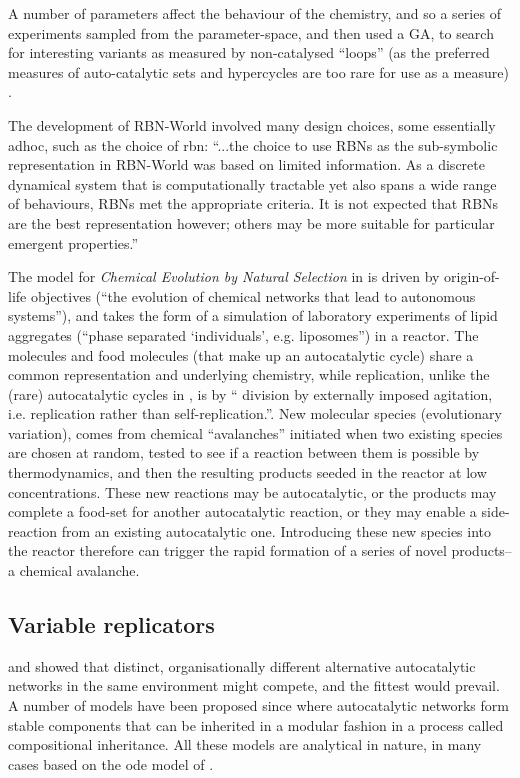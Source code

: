 A number of parameters affect the behaviour of the chemistry, and so a series of experiments sampled from the parameter-space, and then used a GA, to search for interesting variants as measured by non-catalysed ``loops'' (as the preferred measures of auto-catalytic sets and \glspl{hypercycle} are too rare for use as a measure) \parencite[chap.8]{Faulconbridge2011}. 

The development of RBN-World involved many design choices, some essentially adhoc, such as the choice of \gls{rbn}: ``...the choice to use RBNs as the sub-symbolic representation in RBN-World was based on limited information. As a discrete dynamical system that is computationally tractable yet also spans a wide range of behaviours, RBNs met the appropriate criteria. It is not expected that RBNs are the best representation however; others may be more suitable for particular emergent properties.''

The model for \emph{Chemical Evolution by Natural Selection} in \textcite{Fernando:2008xy,Fernando:2007pf} is driven by origin-of-life objectives (``the evolution of chemical networks that lead to autonomous systems''), and takes the form of a simulation of laboratory experiments of lipid aggregates (``phase separated ‘individuals’, e.g. liposomes'') in a reactor. The molecules and food molecules (that make up an autocatalytic cycle) share a common representation and underlying chemistry, while replication, unlike the (rare) autocatalytic cycles in \textcite{Faulconbridge2011}, is by `` division by externally imposed agitation, i.e. replication rather than self-replication.''. New molecular species (evolutionary variation), comes from chemical ``avalanches'' initiated when two existing species are chosen at random, tested to see if a reaction between them is possible by thermodynamics, and then the resulting products seeded in the reactor at low concentrations. These new reactions may be autocatalytic, or the products may complete a food-set for another autocatalytic reaction, or they may enable a side-reaction from an existing autocatalytic one. Introducing these new species into the reactor therefore can trigger the rapid formation of a series of novel products--a chemical avalanche.

\subsection{Variable replicators}\label{variable-replicators}

\Textcite{Ganti:2003hl} and  \textcite{Eigen1971} showed that distinct, organisationally different alternative autocatalytic networks in the same environment might compete, and the fittest would prevail. A number of models have been proposed since where autocatalytic networks form stable components that can be inherited in a modular fashion in a process called compositional inheritance. All these models are analytical in nature, in many cases based on the \gls{ode} model of \cite{Farmer1986}.

